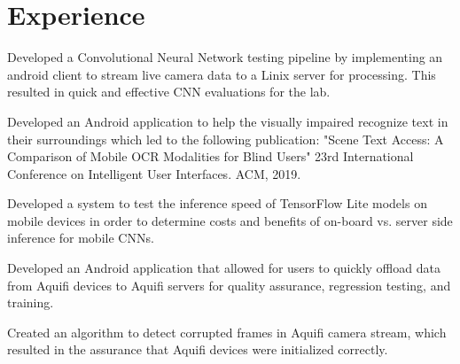 \documentclass[letterpaper]{deedy-resume} %
\begin{document}
\begin{minipage}[t]{0.66\textwidth} %


\section{Experience}


\vspace{\topsep} %
\begin{tightitemize}
	\item Developed a Convolutional Neural Network testing pipeline by implementing an android client to stream  live camera data to a Linix server for processing. This resulted in quick and effective CNN evaluations for the lab. 
	\item Developed an Android application to help the visually impaired recognize text in their surroundings which led to the following publication: "Scene Text Access: A Comparison of Mobile OCR Modalities for Blind Users" 23rd International Conference on Intelligent User Interfaces. ACM, 2019.
	\item Developed a system to test the inference speed of TensorFlow Lite models on mobile devices in order to determine costs and benefits of on-board vs. server side inference for mobile CNNs.
\end{tightitemize}
\sectionspace %


\begin{tightitemize}
	\item Developed an Android application that allowed for users to quickly offload data from Aquifi devices to Aquifi servers for quality assurance, regression testing, and training.
	\item Created an algorithm to detect corrupted frames in Aquifi camera stream, which resulted in the assurance that Aquifi devices were initialized correctly.
\end{tightitemize}


\end{minipage}
\end{document}
